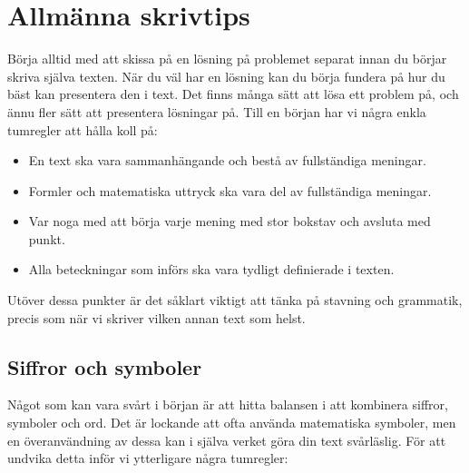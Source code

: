 \documentclass[titlepage]{article}
\begin{document}

\section{Allmänna skrivtips}\label{ch2}

Börja alltid med att skissa på en lösning på problemet separat innan du börjar skriva själva texten. När du väl har en lösning kan du börja fundera på hur du bäst kan presentera den i text. Det finns många sätt att lösa ett problem på, och ännu fler sätt att presentera lösningar på. Till en början har vi några enkla tumregler att hålla koll på:

\begin{itemize}
    \item En text ska vara sammanhängande och bestå av fullständiga meningar.
    \item Formler och matematiska uttryck ska vara del av fullständiga meningar.
    \item Var noga med att börja varje mening med stor bokstav och avsluta med punkt.
    \item Alla beteckningar som införs ska vara tydligt definierade i texten.
\end{itemize}

Utöver dessa punkter är det såklart viktigt att tänka på stavning och grammatik, precis som när vi skriver vilken annan text som helst.




\subsection{Siffror och symboler}

Något som kan vara svårt i början är att hitta balansen i att kombinera siffror, symboler och ord. Det är lockande att ofta använda matematiska symboler, men en överanvändning av dessa kan i själva verket göra din text svårläslig. För att undvika detta inför vi ytterligare några tumregler:
\end{document}
